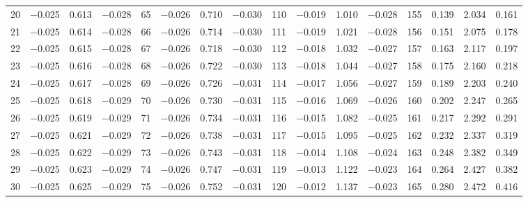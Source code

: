 \begin{table}[!h]
{\begin{tabular}{rrrr|rrrr|rrrr|crrr}
 20 & \tiny{ $-$0.025} &   0.613 & \tiny{ $-$0.028} &  65 & \tiny{ $-$0.026} &   0.710 & \tiny{ $-$0.030} & 110 & \tiny{ $-$0.019} &   1.010 & \tiny{ $-$0.028} & 155 & \tiny{  0.139} &   2.034 & \tiny{  0.161}\\
 21 & \tiny{ $-$0.025} &   0.614 & \tiny{ $-$0.028} &  66 & \tiny{ $-$0.026} &   0.714 & \tiny{ $-$0.030} & 111 & \tiny{ $-$0.019} &   1.021 & \tiny{ $-$0.028} & 156 & \tiny{  0.151} &   2.075 & \tiny{  0.178}\\
 22 & \tiny{ $-$0.025} &   0.615 & \tiny{ $-$0.028} &  67 & \tiny{ $-$0.026} &   0.718 & \tiny{ $-$0.030} & 112 & \tiny{ $-$0.018} &   1.032 & \tiny{ $-$0.027} & 157 & \tiny{  0.163} &   2.117 & \tiny{  0.197}\\
 23 & \tiny{ $-$0.025} &   0.616 & \tiny{ $-$0.028} &  68 & \tiny{ $-$0.026} &   0.722 & \tiny{ $-$0.030} & 113 & \tiny{ $-$0.018} &   1.044 & \tiny{ $-$0.027} & 158 & \tiny{  0.175} &   2.160 & \tiny{  0.218}\\
 24 & \tiny{ $-$0.025} &   0.617 & \tiny{ $-$0.028} &  69 & \tiny{ $-$0.026} &   0.726 & \tiny{ $-$0.031} & 114 & \tiny{ $-$0.017} &   1.056 & \tiny{ $-$0.027} & 159 & \tiny{  0.189} &   2.203 & \tiny{  0.240}\\
 25 & \tiny{ $-$0.025} &   0.618 & \tiny{ $-$0.029} &  70 & \tiny{ $-$0.026} &   0.730 & \tiny{ $-$0.031} & 115 & \tiny{ $-$0.016} &   1.069 & \tiny{ $-$0.026} & 160 & \tiny{  0.202} &   2.247 & \tiny{  0.265}\\
 26 & \tiny{ $-$0.025} &   0.619 & \tiny{ $-$0.029} &  71 & \tiny{ $-$0.026} &   0.734 & \tiny{ $-$0.031} & 116 & \tiny{ $-$0.015} &   1.082 & \tiny{ $-$0.025} & 161 & \tiny{  0.217} &   2.292 & \tiny{  0.291}\\
 27 & \tiny{ $-$0.025} &   0.621 & \tiny{ $-$0.029} &  72 & \tiny{ $-$0.026} &   0.738 & \tiny{ $-$0.031} & 117 & \tiny{ $-$0.015} &   1.095 & \tiny{ $-$0.025} & 162 & \tiny{  0.232} &   2.337 & \tiny{  0.319}\\
 28 & \tiny{ $-$0.025} &   0.622 & \tiny{ $-$0.029} &  73 & \tiny{ $-$0.026} &   0.743 & \tiny{ $-$0.031} & 118 & \tiny{ $-$0.014} &   1.108 & \tiny{ $-$0.024} & 163 & \tiny{  0.248} &   2.382 & \tiny{  0.349}\\
 29 & \tiny{ $-$0.025} &   0.623 & \tiny{ $-$0.029} &  74 & \tiny{ $-$0.026} &   0.747 & \tiny{ $-$0.031} & 119 & \tiny{ $-$0.013} &   1.122 & \tiny{ $-$0.023} & 164 & \tiny{  0.264} &   2.427 & \tiny{  0.382}\\
 30 & \tiny{ $-$0.025} &   0.625 & \tiny{ $-$0.029} &  75 & \tiny{ $-$0.026} &   0.752 & \tiny{ $-$0.031} & 120 & \tiny{ $-$0.012} &   1.137 & \tiny{ $-$0.023} & 165 & \tiny{  0.280} &   2.472 & \tiny{  0.416}\\

\end{tabular}}
\end{table}

